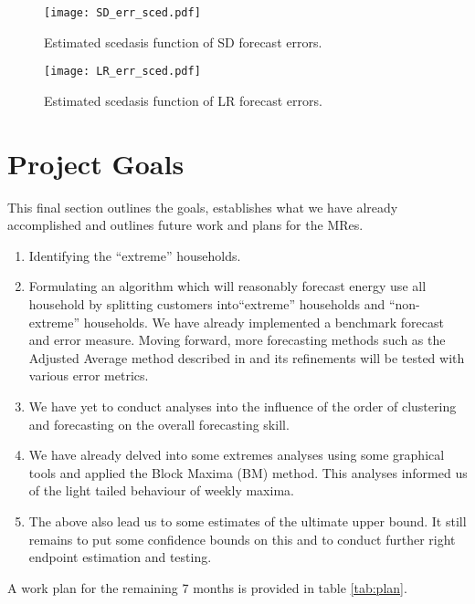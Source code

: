 \documentclass[a4paper]{article}
\begin{document}
\begin{figure}
\centering
\texttt{[image: SD\_err\_sced.pdf]}
\caption{\label{fig:SD_err_sced} Estimated scedasis function of SD forecast errors.}
\end{figure}

\begin{figure}
\centering
\texttt{[image: LR\_err\_sced.pdf]}
\caption{\label{fig:LR_err_sced} Estimated scedasis function of LR forecast errors.}
\end{figure}




\clearpage
\section{Project Goals}
\label{sec:goals}
This final section outlines the goals, establishes what we have already accomplished and outlines future work and plans for the MRes.

\begin{enumerate}
\item Identifying the ``extreme'' households.
\item Formulating an algorithm which will reasonably forecast energy use all household by splitting customers into``extreme'' households and ``non-extreme'' households. We have already implemented a benchmark forecast and error measure. Moving forward, more forecasting methods such as the Adjusted Average method described in \cite{dan14} and its refinements will be tested with various error metrics. 
\item We have yet to conduct analyses into the influence of the order of clustering and forecasting on the overall forecasting skill.
\item We have already delved into some extremes analyses using some graphical tools and applied the Block Maxima (BM) method. This analyses informed us of the light tailed behaviour of weekly maxima.
\item The above also lead us to some estimates of the ultimate upper bound. It still remains to put some confidence bounds on this and to conduct further right endpoint estimation and testing.
\end{enumerate}

A work plan for the remaining 7 months is provided in table \ref{tab:plan}. \newline
\end{document}
